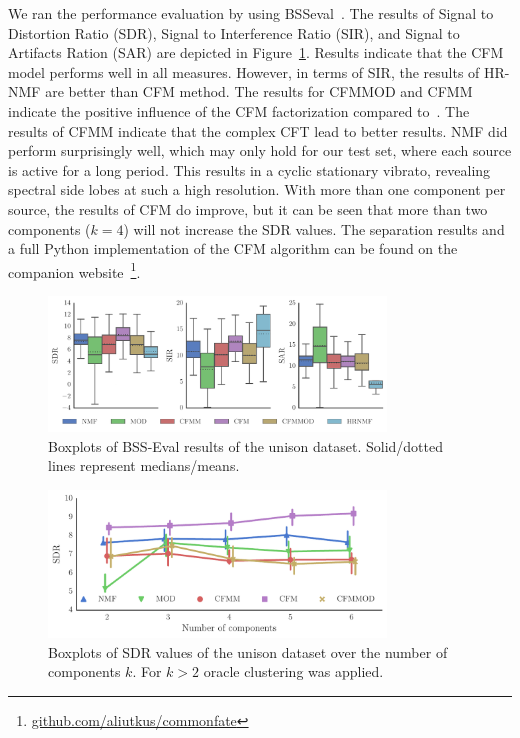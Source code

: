 We ran the performance evaluation by using BSSeval~\cite{vincent06}. The results of Signal to Distortion
Ratio (SDR), Signal to Interference Ratio (SIR), and Signal to Artifacts Ration (SAR) are depicted in Figure~\ref{fig:boxplot_overall}. 
Results indicate that the CFM model performs well in all measures. 
However, in terms of SIR, the results of HR-NMF are better than CFM method. The results for CFMMOD and CFMM indicate the positive influence of the CFM factorization compared to~\cite{barker13}.
The results of CFMM indicate that the complex CFT lead to better results. NMF did perform surprisingly well, which may only hold for our test set, where each source is active for a long period. This results in a cyclic stationary vibrato, revealing spectral side lobes at such a high resolution. With more than one component per source, the results of CFM do improve, but it can be seen that more than two components ($k=4$) will not increase the SDR values. The separation results and a full Python implementation of the CFM algorithm can be found on the companion website~\footnote{\url{github.com/aliutkus/commonfate}}.

\begin{figure}[ht!]
\centering
		\includegraphics[width=0.8\textwidth]{Chapters/06_Separation_Unknown/figures/cfm_boxplot.pdf}
\caption{Boxplots of BSS-Eval results of the unison dataset. Solid/dotted lines represent medians/means.}
\label{fig:boxplot_overall}
\end{figure}

\begin{figure}[ht!]
\centering
		\includegraphics[width=0.8\textwidth]{Chapters/06_Separation_Unknown/figures/iterations.pdf}
\caption{Boxplots of SDR values of the unison dataset over the number of components $k$. For $k>2$ oracle clustering was applied.}
\label{fig:iterations}
\end{figure}

